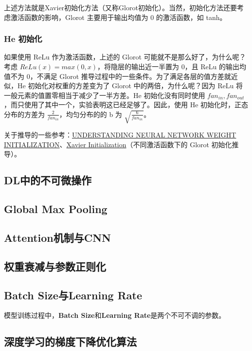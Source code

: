 上述方法就是Xavier初始化方法（又称Glorot初始化）。当然，初始化方法还要考虑激活函数的影响，Glorot 主要用于输出均值为 0 的激活函数，如 tanh。

\subsubsection{He 初始化}
如果使用 ReLu 作为激活函数，上述的 Glorot 可能就不是那么好了，为什么呢？考虑 $ReLu(x) = max(0, x)$，将隐层的输出近一半置为 0，且 ReLu 的输出均值不为 0，不满足 Glorot 推导过程中的一些条件。为了满足各层的值方差就近似，He 初始化对权重的方差变为了 Glorot 中的两倍，为什么呢？因为 ReLu 将一般元素的值置零相当于减少了一半方差。He 初始化没有同时使用 $fan_{in}, fan_{out}$，而只使用了其中一个，实验表明这已经足够了。因此，使用 He 初始化时，正态分布的方差为 $\frac{2}{fan_{in}}$，均匀分布的的 b 为 $\sqrt{\frac{6}{fan_{in}}}$。

关于推导的一些参考：\href{https://intoli.com/blog/neural-network-initialization/}{UNDERSTANDING NEURAL NETWORK WEIGHT INITIALIZATION}、\href{https://mnsgrg.com/2017/12/21/xavier-initialization/}{Xavier Initialization}（不同激活函数下的 Glorot 初始化推导）。



\subsection{DL中的不可微操作}

\subsection{Global Max Pooling}

\subsection{Attention机制与CNN}

\subsection{权重衰减与参数正则化}

\subsection{Batch Size与Learning Rate}
模型训练过程中，\textbf{Batch Size}和\textbf{Learning Rate}是两个不可不调的参数。


\subsection{深度学习的梯度下降优化算法}


